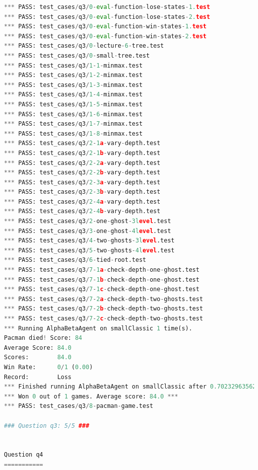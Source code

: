 \documentclass{report}
\begin{document}
\begin{lstlisting}[language=Python, caption=Resultados del Autograder]
*** PASS: test_cases/q3/0-eval-function-lose-states-1.test
*** PASS: test_cases/q3/0-eval-function-lose-states-2.test
*** PASS: test_cases/q3/0-eval-function-win-states-1.test
*** PASS: test_cases/q3/0-eval-function-win-states-2.test
*** PASS: test_cases/q3/0-lecture-6-tree.test
*** PASS: test_cases/q3/0-small-tree.test
*** PASS: test_cases/q3/1-1-minmax.test
*** PASS: test_cases/q3/1-2-minmax.test
*** PASS: test_cases/q3/1-3-minmax.test
*** PASS: test_cases/q3/1-4-minmax.test
*** PASS: test_cases/q3/1-5-minmax.test
*** PASS: test_cases/q3/1-6-minmax.test
*** PASS: test_cases/q3/1-7-minmax.test
*** PASS: test_cases/q3/1-8-minmax.test
*** PASS: test_cases/q3/2-1a-vary-depth.test
*** PASS: test_cases/q3/2-1b-vary-depth.test
*** PASS: test_cases/q3/2-2a-vary-depth.test
*** PASS: test_cases/q3/2-2b-vary-depth.test
*** PASS: test_cases/q3/2-3a-vary-depth.test
*** PASS: test_cases/q3/2-3b-vary-depth.test
*** PASS: test_cases/q3/2-4a-vary-depth.test
*** PASS: test_cases/q3/2-4b-vary-depth.test
*** PASS: test_cases/q3/2-one-ghost-3level.test
*** PASS: test_cases/q3/3-one-ghost-4level.test
*** PASS: test_cases/q3/4-two-ghosts-3level.test
*** PASS: test_cases/q3/5-two-ghosts-4level.test
*** PASS: test_cases/q3/6-tied-root.test
*** PASS: test_cases/q3/7-1a-check-depth-one-ghost.test
*** PASS: test_cases/q3/7-1b-check-depth-one-ghost.test
*** PASS: test_cases/q3/7-1c-check-depth-one-ghost.test
*** PASS: test_cases/q3/7-2a-check-depth-two-ghosts.test
*** PASS: test_cases/q3/7-2b-check-depth-two-ghosts.test
*** PASS: test_cases/q3/7-2c-check-depth-two-ghosts.test
*** Running AlphaBetaAgent on smallClassic 1 time(s).
Pacman died! Score: 84
Average Score: 84.0
Scores:        84.0
Win Rate:      0/1 (0.00)
Record:        Loss
*** Finished running AlphaBetaAgent on smallClassic after 0.7023296356201172 seconds.
*** Won 0 out of 1 games. Average score: 84.0 ***
*** PASS: test_cases/q3/8-pacman-game.test

### Question q3: 5/5 ###


Question q4
===========


\end{lstlisting}
\end{document}
